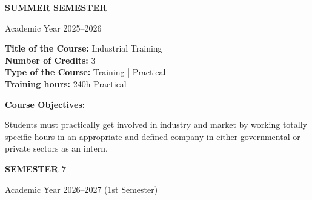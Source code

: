 \documentclass[12pt,a4paper]{article}
\begin{document}
\newpage
\vspace*{\fill}
\begin{center}
  {\fontsize{28pt}{34pt}\selectfont \textbf{SUMMER SEMESTER}}\par\vspace{12pt}
  {\fontsize{13pt}{17pt}\selectfont Academic Year 2025–2026}
\end{center}
\vspace*{\fill}

\newpage
\nopagebreak
\textbf{Title of the Course:} Industrial Training\\
\textbf{Number of Credits:} 3\\
\textbf{Type of the Course:} Training | Practical\\
\textbf{Training hours:} 240h Practical\par\vspace{4pt}
\textbf{Course Objectives:}\par\vspace{2pt}
Students must practically get involved in industry and market by working totally specific hours in
an appropriate and defined company in either governmental or private sectors as an intern.\par\vspace{4pt}

\newpage
\vspace*{\fill}
\begin{center}
  {\fontsize{28pt}{34pt}\selectfont \textbf{SEMESTER 7}}\par\vspace{12pt}
  {\fontsize{13pt}{17pt}\selectfont Academic Year 2026–2027 (1st Semester)}
\end{center}
\vspace*{\fill}
\end{document}
